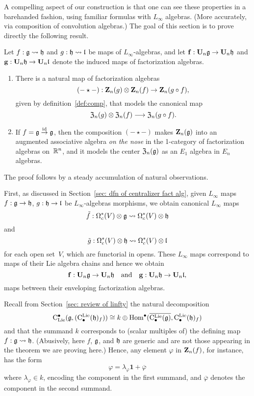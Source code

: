 \documentclass[11pt]{amsart}
\numberwithin{equation}{section}
\begin{document}
A compelling aspect of our construction is that one can see these properties in a barehanded fashion,
using familiar formulas with $L_\infty$ algebras.
(More accurately, via composition of convolution algebras.)
The goal of this section is to prove directly the following result.

\begin{thm}
\label{T:compcentralizer}
Let $f: \mathfrak g \rightsquigarrow \mathfrak h$ and $g: \mathfrak h \rightsquigarrow \mathfrak l$ be maps of  $L_\infty$-algebras,
and let $\bold{f}: \mathbf U_n \mathfrak g \to \mathbf U_n \mathfrak h$ and $\bold{g}: \mathbf U_n \mathfrak h \to \mathbf U_n \mathfrak l$ denote the induced maps of factorization algebras.
\begin{enumerate} 
\item There is a natural map of factorization algebras
\[
(-\star-) : \mathbf Z_n(g) \otimes \mathbf Z_n(f) \to \mathbf Z_n(g \circ f),
\]
given by definition~\ref{def:comp}, 
that models the canonical map 
\[
{\frak Z}_n(g) \otimes {\frak Z}_n(f) \longrightarrow {\frak Z}_n(g\circ f).
\] 
\item If $f= \mathfrak g \stackrel{{\rm id}}\to \mathfrak g$, 
then the composition $(-\star-)$ makes $\mathbf Z_n(\mathfrak g)$ into an 
augmented associative algebra {\em on the nose} in the 1-category of factorization algebras on~$\mathbb R^n$,
and it models the center ${\frak Z}_n(\mathfrak g)$ as an $E_1$ algebra in $E_n$ algebras.
\end{enumerate}
\end{thm}

The proof follows by a steady accumulation of natural observations.

First, as discussed in Section~\ref{sec: dfn of centralizer fact alg},
given $L_\infty$ maps $f: \mathfrak g \to \mathfrak h$, $g: \mathfrak h \to \mathfrak l$ be  $L_\infty$-algebras morphisms,
we obtain canonical $L_\infty$ maps
\[
\tilde{f}: \Omega^*_c(V) \otimes \mathfrak g \rightsquigarrow \Omega^*_c(V) \otimes \mathfrak h
\]
and
\[
\tilde{g}: \Omega^*_c(V) \otimes \mathfrak h \rightsquigarrow \Omega^*_c(V) \otimes \mathfrak l
\]
for each open set~$V$,
which are functorial in opens.
These $L_\infty$ maps correspond to maps of their Lie algebra chains and hence we obtain
\[ 
\mathbf{f}: \mathbf U_n \mathfrak g \to  \mathbf U_n \mathfrak h \quad \text{and} \quad \mathbf{g}: \mathbf U_n \mathfrak h \to  \mathbf U_n \mathfrak l,
\]
maps between their enveloping factorization algebras.

Recall from Section~\ref{sec: review of linfty} the natural decomposition 
\[
{\rm C}_{\rm Lie}^\bullet(\mathfrak g,({\rm C}^{\rm Lie}_\bullet(\mathfrak h)_f)) \cong k \oplus {\rm Hom}^\bullet(\overline{{\rm C}^{\rm Lie}_\bullet(\mathfrak g)}, {\rm C}^{\rm Lie}_\bullet(\mathfrak h)_f)
\]
and that the summand $k$ corresponds to (scalar multiples of) the defining map~$f: \mathfrak g \rightsquigarrow \mathfrak h$.
(Abusively, here $f$, $\mathfrak g$, and $\mathfrak h$ are generic and are not those appearing in the theorem we are proving here.)
Hence, any element $\varphi$ in $\mathbf Z_n(f)$, for instance, has the form
\[
\varphi =\lambda_\varphi \mathbf{1} +\overline{\varphi}
\]
where $\lambda_\varphi \in k$, encoding the component in the first summand, and $\overline{\varphi}$ denotes the component in the second summand.
\end{document}

